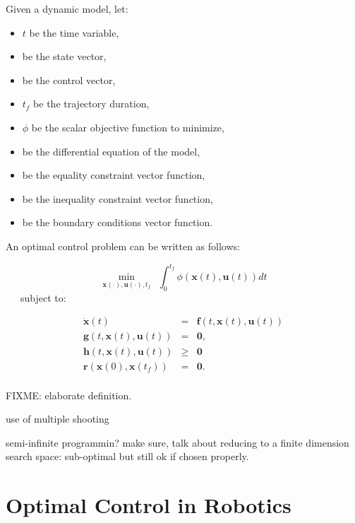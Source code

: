 Given a dynamic model, let:
\begin{itemize}
\item $t$ be the time variable,
\item \state{} be the state vector, 
\item \control{} be the control vector,
\item $t_f$ be the trajectory duration,
\item $\phi$ be the scalar objective function to minimize,
\item \dfcn{} be the differential equation of the model,
\item \eqcstr{} be the equality constraint vector function,
\item \ineqcstr{} be the inequality constraint vector function,
\item \bndcstr{} be the boundary conditions vector function. 
\end{itemize}

An optimal control problem can be written as follows:

\label{OCP}
\begin{equation}
  \min_{\mathbf{x} (\cdot), \mathbf{u} (\cdot), t_f} \ \ 
  \int_{0}^{t_{f}}\phi (\mathbf{x}(t), \mathbf{u}(t))dt
  \label{OCP:Obj}
\end{equation}
\ \ \ subject to:

\begin{equation}
  \begin{array}{rcl}
  \dot{\mathbf{x}} (t) & = & \mathbf{f}(t, \mathbf{x}(t), \mathbf{u}(t)) \label{OCP:Model}
  \\
  \mathbf{g}(t, \mathbf{x}(t), \mathbf{u}(t)) & = & \mathbf{0},
  \\
  \mathbf{h}(t, \mathbf{x}(t), \mathbf{u}(t)) & \ge & \mathbf{0}%
  \\
  \mathbf{r} (\mathbf{x}(0), \mathbf{x}(t_{f})) & = & \mathbf{0}.
  \\
  \end{array}
\end{equation} 

FIXME: elaborate definition.

use of multiple shooting

semi-infinite programmin? make sure, talk about reducing to a finite
dimension search space: sub-optimal but still ok if chosen properly.

\section{Optimal Control in Robotics}

